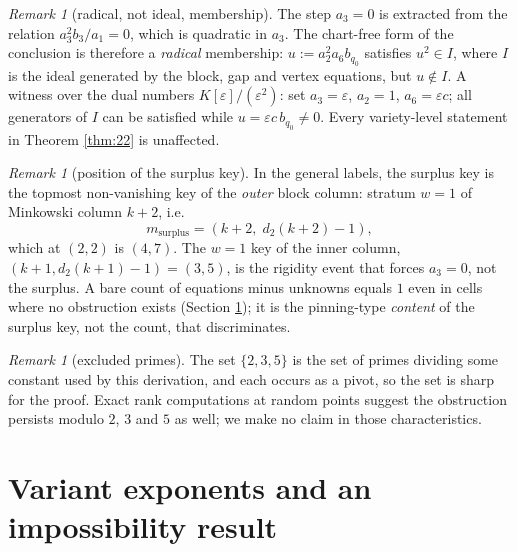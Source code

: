 \documentclass[11pt]{article}
\theoremstyle{definition}
\theoremstyle{remark}
\newtheorem{remark}[theorem]{Remark}
\begin{document}
\begin{remark}[radical, not ideal, membership]\label{rem:radical}
The step $a_3=0$ is extracted from the relation $a_3^2b_3/a_1=0$, which is quadratic in $a_3$. The chart-free form of the conclusion is therefore a \emph{radical} membership: $u:=a_2^2a_6b_{q_0}$ satisfies $u^2\in I$, where $I$ is the ideal generated by the block, gap and vertex equations, but $u\notin I$. A witness over the dual numbers $K[\varepsilon]/(\varepsilon^2)$: set $a_3=\varepsilon$, $a_2=1$, $a_6=\varepsilon c$; all generators of $I$ can be satisfied while $u=\varepsilon c\, b_{q_0}\neq 0$. Every variety-level statement in Theorem \ref{thm:22} is unaffected.
\end{remark}

\begin{remark}[position of the surplus key]\label{rem:position}
In the general labels, the surplus key is the topmost non-vanishing key of the \emph{outer} block column: stratum $w=1$ of Minkowski column $k+2$, i.e.
\[
m_{\mathrm{surplus}}=(k+2,\; d_2(k+2)-1),
\]
which at $(2,2)$ is $(4,7)$. The $w=1$ key of the inner column, $(k+1,d_2(k+1)-1)=(3,5)$, is the rigidity event that forces $a_3=0$, not the surplus. A bare count of equations minus unknowns equals $1$ even in cells where no obstruction exists (Section \ref{sec:variants}); it is the pinning-type \emph{content} of the surplus key, not the count, that discriminates.
\end{remark}

\begin{remark}[excluded primes]
The set $\{2,3,5\}$ is the set of primes dividing some constant used by this derivation, and each occurs as a pivot, so the set is sharp for the proof. Exact rank computations at random points suggest the obstruction persists modulo $2$, $3$ and $5$ as well; we make no claim in those characteristics.
\end{remark}

\section{Variant exponents and an impossibility result}\label{sec:variants}
\end{document}

